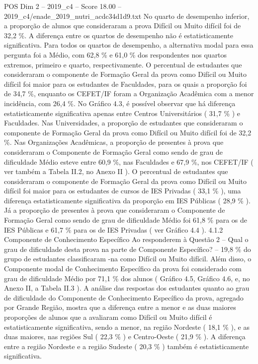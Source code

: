 \begin{textsample}{POS Dim 2 – 2019\_c4 – Score 18.00 – 2019\_c4/enade\_2019\_nutri\_acdc34d1d9.txt}
No quarto de desempenho inferior, a proporção de alunos que consideraram a prova Difícil ou Muito difícil foi de 32,2 \%.
A diferença entre os quartos de desempenho não é estatisticamente significativa.
Para todos os quartos de desempenho, a alternativa modal para essa pergunta foi a Médio, com 62,8 \% e 61,0 \% dos respondentes nos quartos extremos, primeiro e quarto, respectivamente.
O percentual de estudantes que consideraram o componente de Formação Geral da prova como Difícil ou Muito difícil foi maior para os estudantes de Faculdades, para os quais a proporção foi de 34,7 \%, enquanto os CEFET/IF foram a Organização Acadêmica com a menor incidência, com 26,4 \%.
No Gráfico 4.3, é possível observar que há diferença estatisticamente significativa apenas entre Centros Universitários ( 31,7 \% ) e Faculdades.
Nas Universidades, a proporção de estudantes que consideraram o componente de Formação Geral da prova como Difícil ou Muito difícil foi de 32,2 \%.
Nas Organizações Acadêmicas, a proporção de presentes à prova que consideraram o Componente de Formação Geral como sendo de grau de dificuldade Médio esteve entre 60,9 \%, nas Faculdades e 67,9 \%, nos CEFET/IF ( ver também a Tabela II.2, no Anexo II ).
O percentual de estudantes que consideraram o componente de Formação Geral da prova como Difícil ou Muito difícil foi maior para os estudantes de cursos de IES Privadas ( 33,1 \% ), uma diferença estatisticamente significativa da proporção em IES Públicas ( 28,9 \% ).
Já a proporção de presentes à prova que consideraram o Componente de Formação Geral como sendo de grau de dificuldade Médio foi 61,8 \% para os de IES Públicas e 61,7 \% para os de IES Privadas ( ver Gráfico 4.4 ). 4.1.2 Componente de Conhecimento Específico Ao responderem à Questão 2 – Qual o grau de dificuldade desta prova na parte de Componente Específico? – 19,8 \% do grupo de estudantes classificaram -na como Difícil ou Muito difícil.
Além disso, o Componente modal de Conhecimento Específico da prova foi considerado com grau de dificuldade Médio por 71,1 \% dos alunos ( Gráfico 4.5, Gráfico 4.6, e, no Anexo II, a Tabela II.3 ).
A análise das respostas dos estudantes quanto ao grau de dificuldade do Componente de Conhecimento Específico da prova, agregado por Grande Região, mostra que a diferença entre a menor e as duas maiores proporções de alunos que a avaliaram como Difícil ou Muito difícil é estatisticamente significativa, sendo a menor, na região Nordeste ( 18,1 \% ), e as duas maiores, nas regiões Sul ( 22,3 \% ) e Centro-Oeste ( 21,9 \% ).
A diferença entre a região Nordeste e a região Sudeste ( 20,3 \% ) também é estatisticamente significativa.

\end{textsample}
